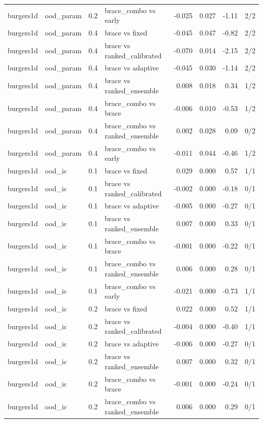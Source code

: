 \begin{tabular}{llllrrrr}
burgers1d & ood\_param & 0.2 & brace\_combo vs early & -0.025 & 0.027 & -1.11 & 2/2 \\
burgers1d & ood\_param & 0.4 & brace vs fixed & -0.045 & 0.047 & -0.82 & 2/2 \\
burgers1d & ood\_param & 0.4 & brace vs ranked\_calibrated & -0.070 & 0.014 & -2.15 & 2/2 \\
burgers1d & ood\_param & 0.4 & brace vs adaptive & -0.045 & 0.030 & -1.14 & 2/2 \\
burgers1d & ood\_param & 0.4 & brace vs ranked\_ensemble & 0.008 & 0.018 & 0.34 & 1/2 \\
burgers1d & ood\_param & 0.4 & brace\_combo vs brace & -0.006 & 0.010 & -0.53 & 1/2 \\
burgers1d & ood\_param & 0.4 & brace\_combo vs ranked\_ensemble & 0.002 & 0.028 & 0.09 & 0/2 \\
burgers1d & ood\_param & 0.4 & brace\_combo vs early & -0.011 & 0.044 & -0.46 & 1/2 \\
burgers1d & ood\_ic & 0.1 & brace vs fixed & 0.029 & 0.000 & 0.57 & 1/1 \\
burgers1d & ood\_ic & 0.1 & brace vs ranked\_calibrated & -0.002 & 0.000 & -0.18 & 0/1 \\
burgers1d & ood\_ic & 0.1 & brace vs adaptive & -0.005 & 0.000 & -0.27 & 0/1 \\
burgers1d & ood\_ic & 0.1 & brace vs ranked\_ensemble & 0.007 & 0.000 & 0.33 & 0/1 \\
burgers1d & ood\_ic & 0.1 & brace\_combo vs brace & -0.001 & 0.000 & -0.22 & 0/1 \\
burgers1d & ood\_ic & 0.1 & brace\_combo vs ranked\_ensemble & 0.006 & 0.000 & 0.28 & 0/1 \\
burgers1d & ood\_ic & 0.1 & brace\_combo vs early & -0.021 & 0.000 & -0.73 & 1/1 \\
burgers1d & ood\_ic & 0.2 & brace vs fixed & 0.022 & 0.000 & 0.52 & 1/1 \\
burgers1d & ood\_ic & 0.2 & brace vs ranked\_calibrated & -0.004 & 0.000 & -0.40 & 1/1 \\
burgers1d & ood\_ic & 0.2 & brace vs adaptive & -0.006 & 0.000 & -0.27 & 0/1 \\
burgers1d & ood\_ic & 0.2 & brace vs ranked\_ensemble & 0.007 & 0.000 & 0.32 & 0/1 \\
burgers1d & ood\_ic & 0.2 & brace\_combo vs brace & -0.001 & 0.000 & -0.24 & 0/1 \\
burgers1d & ood\_ic & 0.2 & brace\_combo vs ranked\_ensemble & 0.006 & 0.000 & 0.29 & 0/1 \\

\end{tabular}
